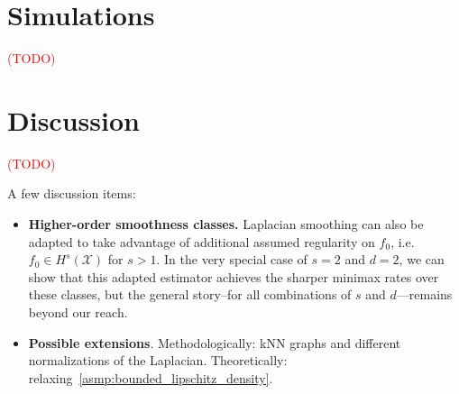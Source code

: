 \documentclass[twoside]{article}
\newcommand{\1}{\mathbf{1}}
\newcommand{\Xset}{\mathcal{X}}
\newcommand{\mc}[1]{\mathcal{#1}}
\theoremstyle{definition}
\theoremstyle{remark}
\begin{document}
\section{Simulations}
\label{sec:simulations}

\textcolor{red}{(TODO)}

\section{Discussion}
\label{sec:discussion}

\textcolor{red}{(TODO)}

A few discussion items:
\begin{itemize}
	\item \textbf{Higher-order smoothness classes.} Laplacian smoothing can also be adapted to take advantage of additional assumed regularity on $f_0$, i.e. $f_0 \in H^s(\mc{\Xset})$ for $s > 1$. In the very special case of $s = 2$ and $d = 2$, we can show that this adapted estimator achieves the sharper minimax rates over these classes, but the general story--for all combinations of $s$ and $d$---remains beyond our reach.
	\item \textbf{Possible extensions}. Methodologically: kNN graphs and different normalizations of the Laplacian. Theoretically: relaxing~\ref{asmp:bounded_lipschitz_density}. 
\end{itemize}


 
\end{document}
